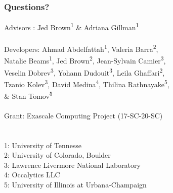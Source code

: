 \documentclass{beamer}
\begin{document}
\begin{frame}
\begin{center}
\frametitle{Questions?}

{\flushleft

Advisors : \hspace{5mm} Jed Brown\textsuperscript{1} \& Adriana Gillman\textsuperscript{1}\\

~\\

Developers: \hspace{2mm} Ahmad Abdelfattah\textsuperscript{1},
Valeria Barra\textsuperscript{2},\\
Natalie Beams\textsuperscript{1},
Jed Brown\textsuperscript{2},
Jean-Sylvain Camier\textsuperscript{3},\\
Veselin Dobrev\textsuperscript{3},
Yohann Dudouit\textsuperscript{3},
Leila Ghaffari\textsuperscript{2},\\
Tzanio Kolev\textsuperscript{3},
David Medina\textsuperscript{4},
Thilina Rathnayake\textsuperscript{5},\\
\&
Stan Tomov\textsuperscript{5}\\

~\\

Grant: \hspace{11mm} Exascale Computing Project (17-SC-20-SC)\\

~\\

~\\

\small{1: University of Tennesse\\
2: University of Colorado, Boulder\\
3: Lawrence Livermore National Laboratory\\
4: Occalytics LLC\\
5: University of Illinois at Urbana-Champaign\\}}

\end{center}
\end{frame}


\begin{frame}[noframenumbering]
\titlepage %
\end{frame}


\end{document}
